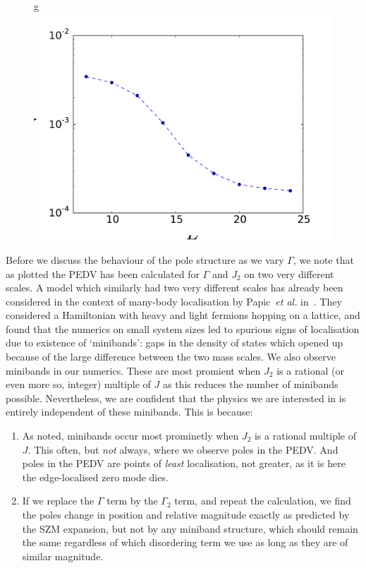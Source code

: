 \documentclass [a4paper, 11pt]{article}
\begin{document}
\begin{figure} [htbp]
\centering
g \includegraphics[width=\linewidth]{kemp_height.pdf}
\caption{}
\label{fig:saturatepeak}
\end{figure}

Before we discuss the behaviour of the pole structure as we vary $\Gamma$, we note that as plotted the PEDV has been calculated for $\Gamma$ and $J_2$ on two very different scales. A model which similarly had two very different scales has already been considered in the context of many-body localisation by Papic~\textit{et al.} in~\cite{minibands}. They considered a Hamiltonian with heavy and light fermions hopping on a lattice, and found that the numerics on small system sizes led to spurious signs of localisation due to existence of `minibands': gaps in the density of states which opened up because of the large difference between the two mass scales. We also observe minibands in our numerics. These are most promient when $J_2$ is a rational (or even more so, integer) multiple of $J$ as this reduces the number of minibands possible. Nevertheless, we are confident that the physics we are interested in is entirely independent of these minibands. This is because:
\begin{enumerate}
\item As noted, minibands occur most prominetly when $J_2$ is a rational multiple of $J$. This often, but \emph{not} always, where we observe poles in the PEDV. And poles in the PEDV are points of \emph{least} localisation, not greater, as it is here the edge-localised zero mode dies.
\item If we replace the $\Gamma$ term by the $\Gamma_2$ term, and repeat the calculation, we find the poles change in position and relative magnitude exactly as predicted by the SZM expansion, but not by any miniband structure, which should remain the same regardless of which disordering term we use as long as they are of similar magnitude.
\end{enumerate}
\end{document}
